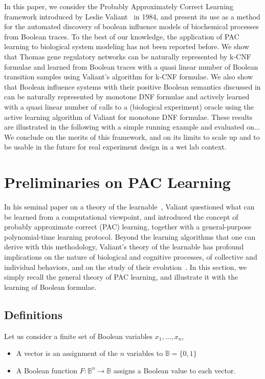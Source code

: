 \documentclass{llncs}
\begin{document}
In this paper, we consider the Probably Approximately Correct Learning framework introduced by Leslie Valiant~\cite{Valiant84cacm} in 1984,
and present its use as a method for the automated discovery of boolean influence models of biochemical processes from Boolean traces. 
To the best of our knowledge, 
the application of PAC learning to biological system modeling has not been reported before.
We show that Thomas gene regulatory networks can be naturally represented by k-CNF formulae
and learned from Boolean traces with a quasi linear number of Boolean transition samples using Valiant's algorithm for k-CNF formulae.
We also show that Boolean influence systems with their positive Boolean semantics discussed in \cite{FMRS16cmsb}
can be naturally represented by monotone DNF formulae and actively learned with a quasi linear number of calls to a (biological experiment) oracle
using the active learning algorithm of Valiant for monotone DNF formulae.
These results are illustrated in the following with a simple running example and evaluated on...
We conclude on the merits of this framework, and on its limits to scale up 
and to be usable in the future for real experiment design in a wet lab context.


\section{Preliminaries on PAC Learning}\label{pac}

In his seminal paper on a theory of the learnable~\cite{Valiant84cacm},
Valiant questioned what can be learned from a computational viewpoint,
and introduced the concept of probably approximate correct (PAC) learning,
together with a general-purpose polynomial-time learning protocol.
Beyond the learning algorithms that one can derive with this methodology,
Valiant's theory of the learnable has profound implications
on the nature of biological and cognitive processes,
of collective and individual behaviors,
and on the study of their evolution~\cite{Valiant13book}.
In this section, we simply recall the general theory of PAC learning,
and illustrate it with the learning of Boolean formulae.

\subsection{Definitions}

Let us consider a finite set of Boolean variables $x_1,\ldots,x_n$,
\begin{itemize}
	\item A vector is an assignment of the $n$ variables to $\mathbb{B} = \{0,1\}$
	\item A Boolean function $F:{\mathbb{B}}^n \rightarrow \mathbb{B}$
	assigns a Boolean value to each vector.
\end{itemize}
\end{document}
